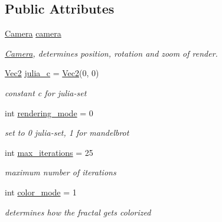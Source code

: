 \subsection*{Public Attributes}
\begin{DoxyCompactItemize}
\item 
\mbox{\label{classJuliaRenderer_a273cae2c0c14f6bddc6196b46928d7bb}} 
\hyperlink{classCamera}{Camera} \hyperlink{classJuliaRenderer_a273cae2c0c14f6bddc6196b46928d7bb}{camera}
\begin{DoxyCompactList}\small\item\em \hyperlink{classCamera}{Camera}, determines position, rotation and zoom of render. \end{DoxyCompactList}\item 
\mbox{\label{classJuliaRenderer_a25369c5dcd4e85a6ee45413b46f59fef}} 
\hyperlink{classVec2}{Vec2} \hyperlink{classJuliaRenderer_a25369c5dcd4e85a6ee45413b46f59fef}{julia\+\_\+c} = \hyperlink{classVec2}{Vec2}(0, 0)
\begin{DoxyCompactList}\small\item\em constant \textquotesingle{}c\textquotesingle{} for julia-\/set \end{DoxyCompactList}\item 
\mbox{\label{classJuliaRenderer_ab2fb36d542bb5e630826cbfdcdfa6d00}} 
int \hyperlink{classJuliaRenderer_ab2fb36d542bb5e630826cbfdcdfa6d00}{rendering\+\_\+mode} = 0
\begin{DoxyCompactList}\small\item\em set to 0 julia-\/set, 1 for mandelbrot \end{DoxyCompactList}\item 
\mbox{\label{classJuliaRenderer_abf1c76861597558bd3b53d5f89c5d94e}} 
int \hyperlink{classJuliaRenderer_abf1c76861597558bd3b53d5f89c5d94e}{max\+\_\+iterations} = 25
\begin{DoxyCompactList}\small\item\em maximum number of iterations \end{DoxyCompactList}\item 
\mbox{\label{classJuliaRenderer_a9e2d7418901019e060bb8cc9e0e9982d}} 
int \hyperlink{classJuliaRenderer_a9e2d7418901019e060bb8cc9e0e9982d}{color\+\_\+mode} = 1
\begin{DoxyCompactList}\small\item\em determines how the fractal gets colorized \end{DoxyCompactList}\end{DoxyCompactItemize}
